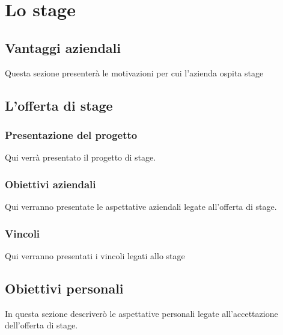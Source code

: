 

\chapter{Lo stage}
\label{cap:stage}

\section{Vantaggi aziendali}
Questa sezione presenterà le motivazioni per cui l'azienda ospita stage

\section{L'offerta di stage}

	\subsection{Presentazione del progetto}
	Qui verrà presentato il progetto di stage.
	
	\subsection{Obiettivi aziendali}
	Qui verranno presentate le aspettative aziendali legate all'offerta di stage.
	
	\subsection{Vincoli}
	Qui verranno presentati i vincoli legati allo stage

\section{Obiettivi personali}
In questa sezione descriverò le aspettative personali legate all'accettazione dell'offerta di stage.
